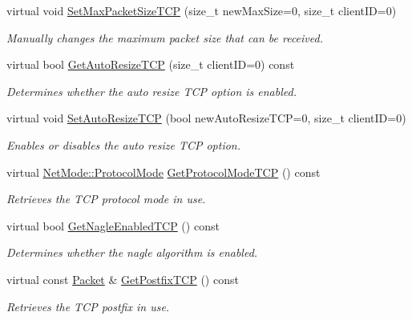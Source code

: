\begin{DoxyCompactItemize}
virtual void \hyperlink{class_net_instance_implemented_t_c_p_aa4d55c285a282ee0da229ddc28fbd814}{SetMaxPacketSizeTCP} (size\_\-t newMaxSize=0, size\_\-t clientID=0)
\begin{DoxyCompactList}\small\item\em Manually changes the maximum packet size that can be received. \item\end{DoxyCompactList}\item 
virtual bool \hyperlink{class_net_instance_implemented_t_c_p_ab72f32de68da213238539eed8c399bd5}{GetAutoResizeTCP} (size\_\-t clientID=0) const 
\begin{DoxyCompactList}\small\item\em Determines whether the auto resize TCP option is enabled. \item\end{DoxyCompactList}\item 
virtual void \hyperlink{class_net_instance_implemented_t_c_p_a39295cf5003406e66e8235d88bb2e282}{SetAutoResizeTCP} (bool newAutoResizeTCP=0, size\_\-t clientID=0)
\begin{DoxyCompactList}\small\item\em Enables or disables the auto resize TCP option. \item\end{DoxyCompactList}\item 
virtual \hyperlink{class_net_mode_a43cfa55ee6a4db66a8d7d6c27f766964}{NetMode::ProtocolMode} \hyperlink{class_net_instance_implemented_t_c_p_a2f21e2227f935bdc92aa09d1fdb4ad18}{GetProtocolModeTCP} () const 
\begin{DoxyCompactList}\small\item\em Retrieves the TCP protocol mode in use. \item\end{DoxyCompactList}\item 
virtual bool \hyperlink{class_net_instance_implemented_t_c_p_aa8ed75c6b08d2973ad5ab56fb33b6265}{GetNagleEnabledTCP} () const 
\begin{DoxyCompactList}\small\item\em Determines whether the nagle algorithm is enabled. \item\end{DoxyCompactList}\item 
virtual const \hyperlink{class_packet}{Packet} \& \hyperlink{class_net_instance_implemented_t_c_p_a533d763914c21bba7e70d36116e432a1}{GetPostfixTCP} () const 
\begin{DoxyCompactList}\small\item\em Retrieves the TCP postfix in use. \item\end{DoxyCompactList}\item 

\end{DoxyCompactItemize}
